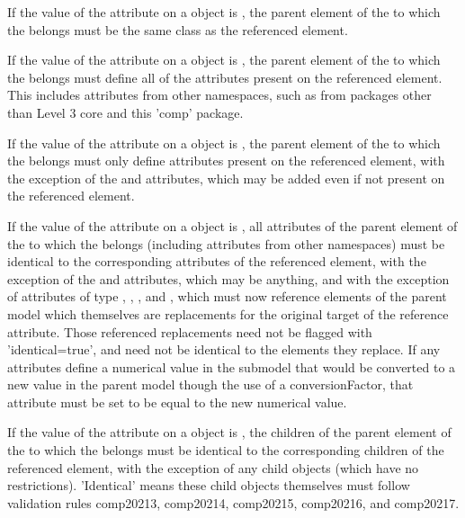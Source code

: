 \begin{sbmlenum}
 { If the value of the  attribute on a
  \ReplacedElement object is , the parent element of the
  \ListOfReplacedElements to which the \ReplacedElement belongs must be
  the same class as the referenced element.} 

 { If the value of the  attribute on a
  \ReplacedElement object is , the parent element of the
  \ListOfReplacedElements to which the \ReplacedElement belongs must
  define all of the attributes present on the referenced element.  This
  includes attributes from other namespaces, such as from packages other
  than Level 3 core and this 'comp' package.} 

 { If the value of the  attribute on
  a \ReplacedElement object is , the parent element of the
  \ListOfReplacedElements to which the \ReplacedElement belongs must
  only define attributes present on the referenced element, with the
  exception of the  and  attributes, which may
  be added even if not present on the referenced element.}

 { If the value of the  attribute on
  a \ReplacedElement object is , all attributes of the parent
  element of the \ListOfReplacedElements to which the \ReplacedElement
  belongs (including attributes from other namespaces) must be identical
  to the corresponding attributes of the referenced element, with the
  exception of the  and  attributes, which may
  be anything, and with the exception of attributes of type
  , , , and
  , which must now reference elements of the parent
  model which themselves are replacements for the original target of the
  reference attribute.  Those referenced replacements need not be
  flagged with 'identical=true', and need not be identical to the
  elements they replace.  If any attributes define a numerical value in
  the submodel that would be converted to a new value in the parent
  model though the use of a conversionFactor, that attribute must be set
  to be equal to the new numerical value.}

 { If the value of the  attribute on
  a \ReplacedElement object is , the children of the parent
  element of the \ListOfReplacedElements to which the \ReplacedElement
  belongs must be identical to the corresponding children of the
  referenced element, with the exception of any child
  \ListOfReplacedElements objects (which have no restrictions).
  'Identical' means these child objects themselves must follow
  validation rules comp20213, comp20214, comp20215, comp20216, and
  comp20217.}


\end{sbmlenum}
